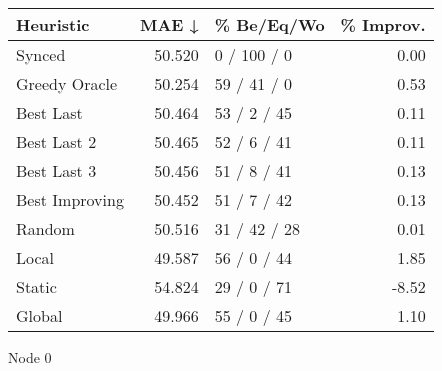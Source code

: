 \begin{tabular}{lrlr}
\toprule
\textbf{Heuristic} & \textbf{MAE ↓} & \textbf{\% Be/Eq/Wo} & \textbf{\% Improv.} \\
\midrule
            Synced &         50.520 &          0 / 100 / 0 &                0.00 \\
     Greedy Oracle &         50.254 &          59 / 41 / 0 &                0.53 \\
         Best Last &         50.464 &          53 / 2 / 45 &                0.11 \\
       Best Last 2 &         50.465 &          52 / 6 / 41 &                0.11 \\
       Best Last 3 &         50.456 &          51 / 8 / 41 &                0.13 \\
    Best Improving &         50.452 &          51 / 7 / 42 &                0.13 \\
            Random &         50.516 &         31 / 42 / 28 &                0.01 \\
             Local &         49.587 &          56 / 0 / 44 &                1.85 \\
            Static &         54.824 &          29 / 0 / 71 &               -8.52 \\
            Global &         49.966 &          55 / 0 / 45 &                1.10 \\
\bottomrule
\end{tabular}
\caption{Node 0}
\label{tab:iid_lr01_le1_bs2_0}
